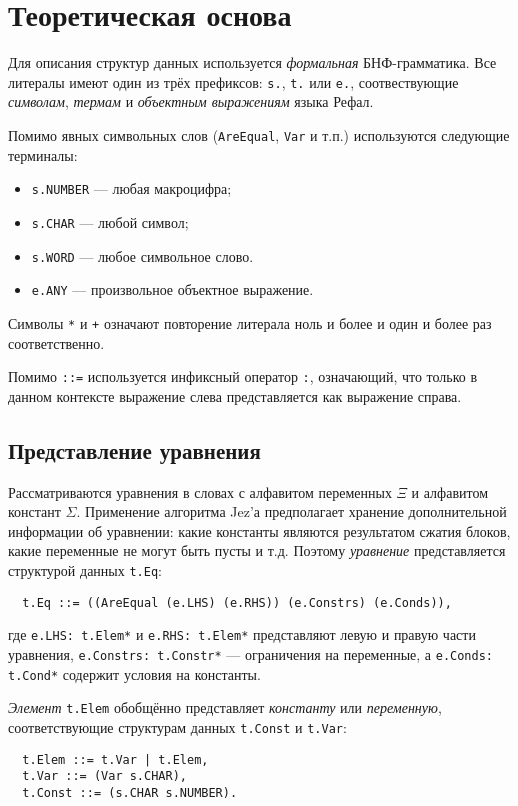 \documentclass[12pt]{article}
\begin{document}
\section{Теоретическая основа}

Для описания структур данных используется \textit{формальная} БНФ-грамматика.
Все литералы имеют один из трёх префиксов: \texttt{s.}, \texttt{t.} или
\texttt{e.}, соотвествующие \textit{символам}, \textit{термам} и
\textit{объектным выражениям} языка Рефал.

Помимо явных символьных слов (\texttt{AreEqual}, \texttt{Var} и т.п.)
используются следующие терминалы:
\begin{itemize}
  \item \texttt{s.NUMBER} --- любая макроцифра; 
  \item \texttt{s.CHAR} --- любой символ; 
  \item \texttt{s.WORD} --- любое символьное слово.
  \item \texttt{e.ANY} --- произвольное объектное выражение.
\end{itemize}

Символы \texttt{*} и \texttt{+} означают повторение литерала ноль и более и
один и более раз соответственно.

Помимо \texttt{::=} используется инфиксный оператор \texttt{:}, означающий,
что только в данном контексте выражение слева представляется как выражение
справа.


\subsection{Представление уравнения}

Рассматриваются уравнения в словах с алфавитом переменных $\Xi$ и алфавитом
констант $\Sigma$. Применение алгоритма Jez'а предполагает хранение
дополнительной информации об уравнении: какие константы являются результатом
сжатия блоков, какие переменные не могут быть пусты и т.д. Поэтому
\textit{уравнение} представляется структурой данных \texttt{t.Eq}:
\begin{Verbatim}
  t.Eq ::= ((AreEqual (e.LHS) (e.RHS)) (e.Constrs) (e.Conds)),
\end{Verbatim}
где \texttt{e.LHS: t.Elem*} и \texttt{e.RHS: t.Elem*} представляют левую и
правую части уравнения, \texttt{e.Constrs: t.Constr*} --- ограничения на
переменные, а \texttt{e.Conds: t.Cond*} содержит условия на константы.

\textit{Элемент} \texttt{t.Elem} обобщённо представляет \textit{константу} или
\textit{переменную}, соответствующие структурам данных \texttt{t.Const} и
\texttt{t.Var}:
\begin{Verbatim}
  t.Elem ::= t.Var | t.Elem,
  t.Var ::= (Var s.CHAR),
  t.Const ::= (s.CHAR s.NUMBER).
\end{Verbatim}
\end{document}
